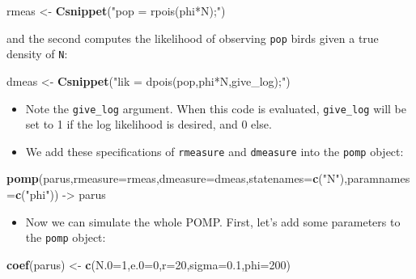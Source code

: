 \documentclass[]{article}
\newenvironment{Shaded}{\begin{snugshade}}{\end{snugshade}}
\newcommand{\KeywordTok}[1]{\textcolor[rgb]{0.13,0.29,0.53}{\textbf{#1}}}
\newcommand{\DataTypeTok}[1]{\textcolor[rgb]{0.13,0.29,0.53}{#1}}
\newcommand{\DecValTok}[1]{\textcolor[rgb]{0.00,0.00,0.81}{#1}}
\newcommand{\FloatTok}[1]{\textcolor[rgb]{0.00,0.00,0.81}{#1}}
\newcommand{\StringTok}[1]{\textcolor[rgb]{0.31,0.60,0.02}{#1}}
\newcommand{\NormalTok}[1]{#1}
\providecommand{\tightlist}{%
  \setlength{\itemsep}{0pt}\setlength{\parskip}{0pt}}
\begin{document}
\begin{Shaded}
\begin{Highlighting}[]
\NormalTok{rmeas <-}\StringTok{ }\KeywordTok{Csnippet}\NormalTok{(}\StringTok{"pop = rpois(phi*N);"}\NormalTok{)}
\end{Highlighting}
\end{Shaded}

and the second computes the likelihood of observing \texttt{pop} birds
given a true density of \texttt{N}:

\begin{Shaded}
\begin{Highlighting}[]
\NormalTok{dmeas <-}\StringTok{ }\KeywordTok{Csnippet}\NormalTok{(}\StringTok{"lik = dpois(pop,phi*N,give_log);"}\NormalTok{)}
\end{Highlighting}
\end{Shaded}

\begin{itemize}
\item
  Note the \texttt{give\_log} argument. When this code is evaluated,
  \texttt{give\_log} will be set to 1 if the log likelihood is desired,
  and 0 else.
\item
  We add these specifications of \texttt{rmeasure} and \texttt{dmeasure}
  into the \texttt{pomp} object:
\end{itemize}

\begin{Shaded}
\begin{Highlighting}[]
\KeywordTok{pomp}\NormalTok{(parus,}\DataTypeTok{rmeasure=}\NormalTok{rmeas,}\DataTypeTok{dmeasure=}\NormalTok{dmeas,}\DataTypeTok{statenames=}\KeywordTok{c}\NormalTok{(}\StringTok{"N"}\NormalTok{),}\DataTypeTok{paramnames=}\KeywordTok{c}\NormalTok{(}\StringTok{"phi"}\NormalTok{)) ->}\StringTok{ }\NormalTok{parus}
\end{Highlighting}
\end{Shaded}

\begin{itemize}
\tightlist
\item
  Now we can simulate the whole POMP. First, let's add some parameters
  to the \texttt{pomp} object:
\end{itemize}

\begin{Shaded}
\begin{Highlighting}[]
\KeywordTok{coef}\NormalTok{(parus) <-}\StringTok{ }\KeywordTok{c}\NormalTok{(}\DataTypeTok{N.0=}\DecValTok{1}\NormalTok{,}\DataTypeTok{e.0=}\DecValTok{0}\NormalTok{,}\DataTypeTok{r=}\DecValTok{20}\NormalTok{,}\DataTypeTok{sigma=}\FloatTok{0.1}\NormalTok{,}\DataTypeTok{phi=}\DecValTok{200}\NormalTok{)}
\end{Highlighting}
\end{Shaded}
\end{document}

